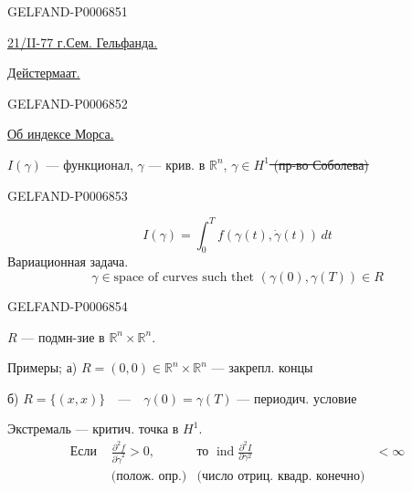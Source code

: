 \begin{GelfandAdjacentEvidence}{GELFAND-P000685}{1}

\underline{21/II-77 г.}\qquad \underline{Сем. Гельфанда.}

\underline{Дейстермаат.}
\end{GelfandAdjacentEvidence}
\begin{GelfandAdjacentEvidence}{GELFAND-P000685}{2}


\underline{Об индексе Морса.}

\(I(\gamma)\) --- функционал, \(\gamma\) --- крив. в \(\mathbb R^n\),
\sout{\(\gamma\in H^1\) (пр-во Соболева)}
\end{GelfandAdjacentEvidence}
\begin{GelfandAdjacentEvidence}{GELFAND-P000685}{3}

\[
I(\gamma)=\int_0^T f(\gamma(t),\dot\gamma(t))\,dt
\]
Вариационная задача.
\[
\gamma\in\text{space of curves such thet }(\gamma(0),\gamma(T))\in R
\]
\end{GelfandAdjacentEvidence}
\begin{GelfandAdjacentEvidence}{GELFAND-P000685}{4}


\(R\) --- подмн-зие в \(\mathbb R^n\times\mathbb R^n\).

Примеры; а) \(R=(0,0)\in\mathbb R^n\times\mathbb R^n\) --- закрепл. концы

б) \(R=\{(x,x)\}\quad\text{---}\quad\gamma(0)=\gamma(T)\) --- периодич. условие
\end{GelfandAdjacentEvidence}


Экстремаль --- критич. точка в \(H^1\).
\[
\begin{aligned}
\text{Если }&\frac{\partial^2 f}{\partial\dot\gamma^2}>0,
&\text{то }\operatorname{ind}\frac{\partial^2 I}{\partial\gamma^2}&<\infty\\
&\text{(полож. опр.)}
&\text{(число отриц. квадр. конечно)}&
\end{aligned}
\]


